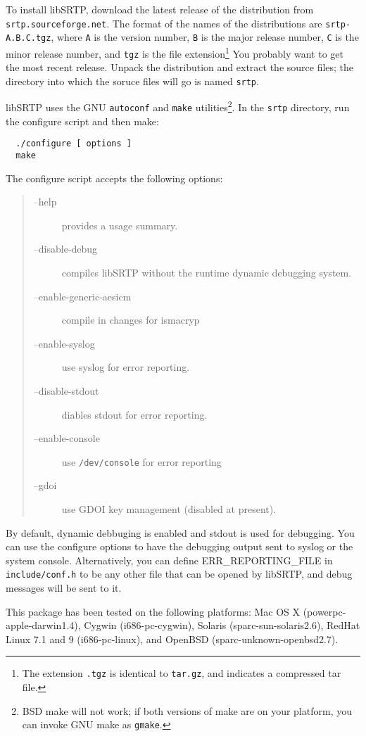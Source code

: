 To install libSRTP, download the latest release of the distribution
from \texttt{srtp.sourceforge.net}.  The format of the names of the
distributions are \texttt{srtp-A.B.C.tgz}, where \texttt{A} is the
version number, \texttt{B} is the major release number, \texttt{C} is
the minor release number, and \texttt{tgz} is the file
extension\footnote{The extension \texttt{.tgz} is identical to
\texttt{tar.gz}, and indicates a compressed tar file.}  You probably
want to get the most recent release.  Unpack the distribution and
extract the source files; the directory into which the soruce files
will go is named \texttt{srtp}.

libSRTP uses the GNU \texttt{autoconf} and \texttt{make}
utilities\footnote{BSD make will not work; if both versions of make
are on your platform, you can invoke GNU make as \texttt{gmake}.}.  In
the \texttt{srtp} directory, run the configure script and then make:
\begin{verbatim}
  ./configure [ options ]       
  make                          
\end{verbatim}
The configure script accepts the following options:
\begin{quote}
\begin{description}
\item[--help]              provides a usage summary.
\item[--disable-debug]     compiles libSRTP without the runtime 
			   dynamic debugging system.
\item[--enable-generic-aesicm] compile in changes for ismacryp
\item[--enable-syslog]     use syslog for error reporting.
\item[--disable-stdout]    diables stdout for error reporting.
\item[--enable-console]    use \texttt{/dev/console} for error reporting
\item[--gdoi]              use GDOI key management (disabled at present).
\end{description}
\end{quote}

By default, dynamic debbuging is enabled and stdout is used for
debugging.  You can use the configure options to have the debugging
output sent to syslog or the system console.  Alternatively, you can
define ERR\_REPORTING\_FILE in \texttt{include/conf.h} to be any other
file that can be opened by libSRTP, and debug messages will be sent to
it.

This package has been tested on the following platforms: Mac OS X
(powerpc-apple-darwin1.4), Cygwin (i686-pc-cygwin), Solaris
(sparc-sun-solaris2.6), RedHat Linux 7.1 and 9 (i686-pc-linux), and
OpenBSD (sparc-unknown-openbsd2.7).


